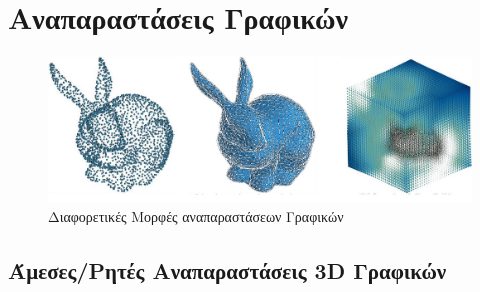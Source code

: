 \label{section:Graphics Representations}

\section{Αναπαραστάσεις Γραφικών}
    \begin{figure}[!tbh]
        \centering
        \includegraphics[width=0.8\linewidth,keepaspectratio]{images/chapter2_img/overall_representation_diff.jpg}
        \caption{Διαφορετικές Μορφές αναπαραστάσεων Γραφικών}
        \label{fig:GraphichRepresentationsTHumbnail}
    \end{figure}
\subsection{Άμεσες/Ρητές Αναπαραστάσεις 3D Γραφικών }
